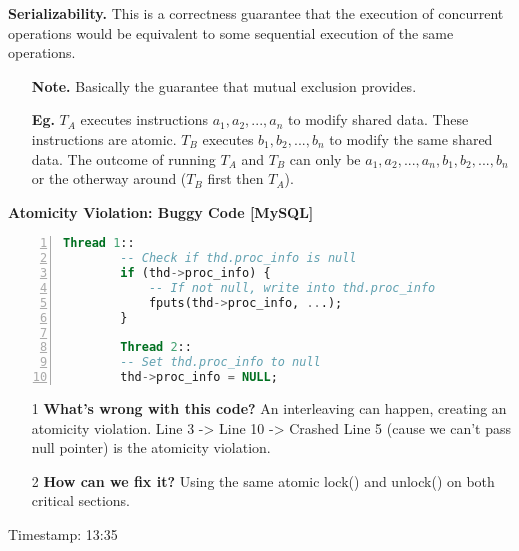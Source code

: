 \documentclass[12pt]{article}
\begin{document}
{\bf Serializability.} {This is a correctness guarantee that the execution of concurrent operations would be equivalent to some sequential execution of the same operations.}
    \begin{enumerate}
        \item[]{\bf Note.} {Basically the guarantee that mutual exclusion provides.}
        \item[]{\bf Eg.} {$T_A$ executes instructions $a_1, a_2, ..., a_n$ to modify shared data. These instructions are atomic. $T_B$ executes $b_1, b_2, ..., b_n$ to modify the same shared data. The outcome of running $T_A$ and $T_B$ can only be } $a_1, a_2, ..., a_n, b_1, b_2, ..., b_n$ or the otherway around ($T_B$ first then $T_A$).
    \end{enumerate}
\vspace{1em}

{\bf Atomicity Violation: Buggy Code [MySQL]}
    \begin{lstlisting}[language=SQL, numbers=left, basicstyle=\ttfamily]
        Thread 1::
        -- Check if thd.proc_info is null
        if (thd->proc_info) {
            -- If not null, write into thd.proc_info
            fputs(thd->proc_info, ...);
        }
        
        Thread 2::
        -- Set thd.proc_info to null
        thd->proc_info = NULL;
    \end{lstlisting}
    \begin{enumerate}
        \item[1]{\bf What's wrong with this code?} {An interleaving can happen, creating an atomicity violation. Line 3 -> Line 10 -> Crashed Line 5 (cause we can't pass null pointer) is the atomicity violation.}
        \item[2]{\bf How can we fix it?} {Using the same atomic lock() and unlock() on both critical sections.}
    \end{enumerate}

Timestamp: 13:35
\end{document}
